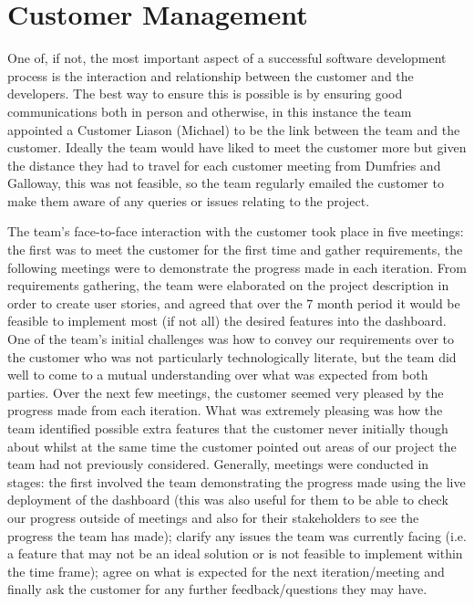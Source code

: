 \documentclass{l3proj}
\begin{document}

\section{Customer Management}
\label{sec:customer-management}

One of, if not, the most important aspect of a successful software development process is the interaction and relationship
between the customer and the developers. The best way to ensure this is possible is by ensuring good communications
both in person and otherwise, in this instance the team appointed a Customer Liason (Michael) to be the link between the
team and the customer. Ideally the team would have liked to meet the customer more but given the distance they had to travel
for each customer meeting from Dumfries and Galloway, this was not feasible, so the team regularly emailed the customer
to make them aware of any queries or issues relating to the project.

The team's face-to-face interaction with the customer took place in five meetings: the first was to meet the customer
for the first time and gather requirements, the following meetings were to demonstrate the progress made in each
iteration. From requirements gathering, the team were elaborated on the project description in order to create user stories,
and agreed that over the 7 month period it would be feasible to implement most (if not all) the desired features into the
dashboard. One of the team's initial challenges was how to convey our requirements over to the customer who was not particularly
technologically literate, but the team did well to come to a mutual understanding over what was expected from both parties.
Over the next few meetings, the customer seemed very pleased by the progress made from each iteration. What was extremely
pleasing was how the team identified possible extra features that the customer never initially though about whilst at the
same time the customer pointed out areas of our project the team had not previously considered. Generally, meetings
were conducted in stages: the first involved the team demonstrating the progress made using the live deployment of the
dashboard (this was also useful for them to be able to check our progress outside of meetings and also for their
stakeholders to see the progress the team has made); clarify any issues the team was currently facing (i.e. a feature
that may not be an ideal solution or is not feasible to implement within the time frame); agree on what is expected
for the next iteration/meeting and finally ask the customer for any further feedback/questions they may have.
\end{document}
